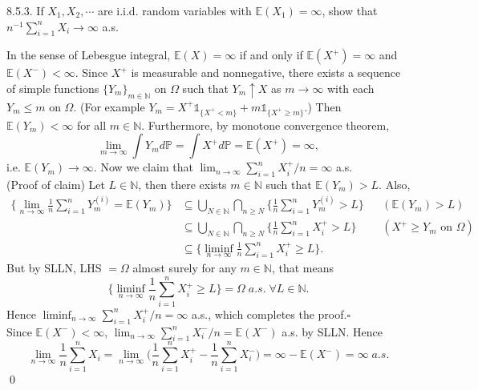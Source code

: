 \begin{exercise} 8.5.3. If $X_1, X_2,\cdots$ are i.i.d. random variables with $\mathbb{E}(X_1) = \infty$,
show that $n^{-1} \sum^n_{i=1} X_i \rightarrow \infty$ a.s.
\end{exercise}
\begin{answer}
In the sense of Lebesgue integral, $\mathbb{E}(X)=\infty$ if and only if $\mathbb{E}(X^+)=\infty$ and $\mathbb{E}(X^-)<\infty$. Since $X^+$ is measurable and nonnegative, there exists a sequence of simple functions $\{Y_m\}_{m\in\mathbb{N}}$ on $\Omega$ such that $Y_m\uparrow X$ as $m\rightarrow\infty$ with each $Y_m\leq m$ on $\Omega$. (For example $Y_m=X^+\mathds{1}_{\{X^+<m\}}+m\mathds{1}_{\{X^+\geq m\}}$.) Then $\mathbb{E}(Y_m)<\infty$ for all $m\in\mathbb{N}$. Furthermore, by monotone convergence theorem,
\begin{equation*}
    \lim_{m\rightarrow\infty}\int Y_md\mathbb{P}=\int X^+d\mathbb{P}=\mathbb{E}(X^+)=\infty,
\end{equation*}
i.e. $\mathbb{E}(Y_m)\rightarrow\infty$. Now we claim that $\lim_{n\rightarrow\infty}\sum_{i=1}^nX_i^+/n=\infty$ a.s.\\
(Proof of claim) Let $L\in\mathbb{N}$, then there exists $m\in\mathbb{N}$ such that $\mathbb{E}(Y_m)>L$. Also,
\begin{equation*}
    \begin{aligned}
        \Big\{\lim_{n\rightarrow\infty}\frac{1}{n}\sum_{i=1}^nY_m^{(i)}=\mathbb{E}(Y_m)\Big\}&\subseteq\bigcup_{N\in\mathbb{N}}\bigcap_{n\geq N}\Big\{\frac{1}{n}\sum_{i=1}^nY_m^{(i)}>L\Big\} && (\mathbb{E}(Y_m)>L)
        \\&
        \subseteq\bigcup_{N\in\mathbb{N}}\bigcap_{n\geq N}\Big\{\frac{1}{n}\sum_{i=1}^nX^+_i>L\Big\} && (X^+\geq Y_m \text{ on } \Omega)
        \\&
        \subseteq\Big\{\liminf_{n\rightarrow\infty}\frac{1}{n}\sum_{i=1}^nX_i^+\geq L\Big\}.
    \end{aligned}
\end{equation*}
But by SLLN, LHS $=\Omega$ almost surely for any $m\in\mathbb{N}$, that means
\begin{equation*}
    \Big\{\liminf_{n\rightarrow\infty}\frac{1}{n}\sum_{i=1}^nX_i^+\geq L\Big\}=\Omega\;a.s.\; \forall L\in\mathbb{N}.
\end{equation*}
Hence $\liminf_{n\rightarrow\infty}\sum^n_{i=1}X_i^+/n=\infty$ a.s., which completes the proof.$\square$\\
Since $\mathbb{E}(X^-)<\infty$, $\lim_{n\rightarrow\infty}\sum_{i=1}^nX_i^-/n=\mathbb{E}(X^-)$ a.s. by SLLN. Hence
\begin{equation*}
    \lim_{n\rightarrow\infty}\frac{1}{n}\sum_{i=1}^nX_i=\lim_{n\rightarrow\infty}\Big(\frac{1}{n}\sum_{i=1}^nX_i^+-\frac{1}{n}\sum_{i=1}^nX_i^-\Big)=\infty-\mathbb{E}(X^-)=\infty\;a.s.
\end{equation*}
\qquad \qed
\end{answer}

